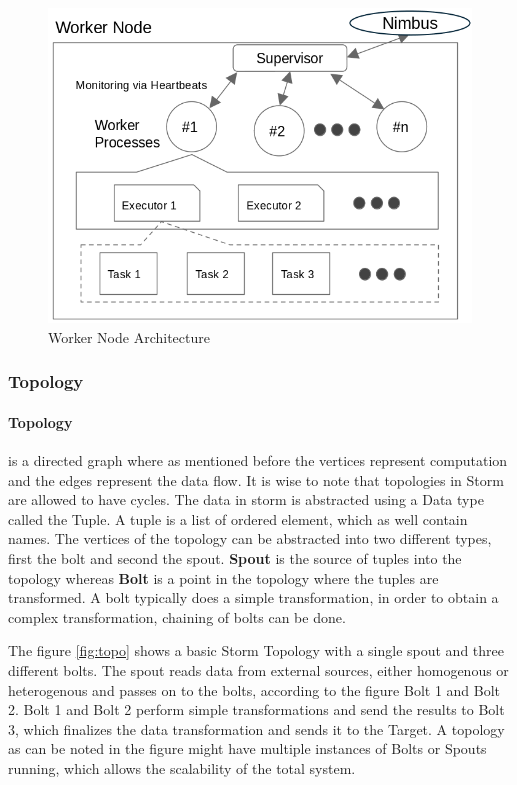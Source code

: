 \documentclass[runningheads,a4paper]{llncs}[2015/06/24]
\begin{document}
\begin{figure}
  \begin{center}
    \includegraphics[width=.85\textwidth]{worker.png}
    \caption{Worker Node Architecture}
    \label{fig:workerarch}
   \end{center}
\end{figure}

\subsubsection{Topology}
\paragraph{Topology} is a directed graph where as mentioned before the vertices represent computation and the edges represent the data flow. It is wise to note that topologies in Storm are allowed to have cycles. The data in storm is abstracted using a Data type called the Tuple. A tuple is a list of ordered element, which as well contain names. The vertices of the topology can be abstracted into two different types, first the bolt and second the spout. \textbf{Spout} is the source of tuples into the topology whereas \textbf{Bolt} is a point in the topology where the tuples are transformed. A bolt typically does a simple transformation, in order to obtain a complex transformation, chaining of bolts can be done. 

The figure \ref{fig:topo} shows a basic Storm Topology with a single spout and three different bolts. The spout reads data from external sources, either homogenous or heterogenous and passes on to the bolts, according to the figure Bolt 1 and Bolt 2. Bolt 1 and Bolt 2 perform simple transformations and send the results to Bolt 3, which finalizes the data transformation and sends it to the Target. A topology as can be noted in the figure might have multiple instances of Bolts or Spouts running, which allows the scalability of the total system.
\end{document}
